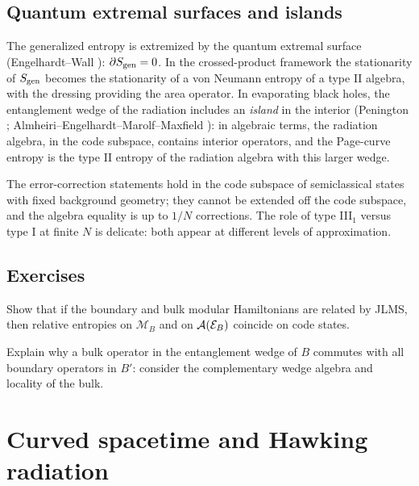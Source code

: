 \subsection{Quantum extremal surfaces and islands}

The generalized entropy is extremized by the quantum extremal surface (Engelhardt--Wall \cite{EngelhardtWall2015}): $\partial S_{\mathrm{gen}}=0$. In the crossed-product framework \cite{CPW2022,JSS2023} the stationarity of $S_{\mathrm{gen}}$ becomes the stationarity of a von Neumann entropy of a type II algebra, with the dressing providing the area operator. In evaporating black holes, the entanglement wedge of the radiation includes an \emph{island} in the interior (Penington \cite{Penington2020}; Almheiri--Engelhardt--Marolf--Maxfield \cite{AEMM2019}): in algebraic terms, the radiation algebra, in the code subspace, contains interior operators, and the Page-curve entropy is the type II entropy of the radiation algebra with this larger wedge.

\begin{whatwrong}
The error-correction statements hold in the code subspace of semiclassical states with fixed background geometry; they cannot be extended off the code subspace, and the algebra equality is up to $1/N$ corrections. The role of type III$_1$ versus type I at finite $N$ is delicate: both appear at different levels of approximation.
\end{whatwrong}

\subsection*{Exercises}
\begin{exercise}\label{ex:ew_qec:1}
Show that if the boundary and bulk modular Hamiltonians are related by JLMS, then relative entropies on $\mathcal M_B$ and on $\mathcal{A}(\mathcal E_B)$ coincide on code states.
\end{exercise}
\begin{exercise}\label{ex:ew_qec:2}
Explain why a bulk operator in the entanglement wedge of $B$ commutes with all boundary operators in $B'$: consider the complementary wedge algebra and locality of the bulk.
\end{exercise}

\section{Curved spacetime and Hawking radiation}\label{ch:curved_hawking}
\skippable

